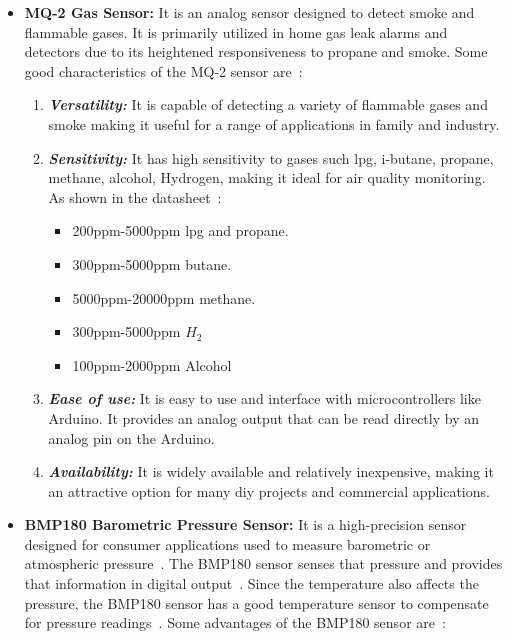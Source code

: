 \begin{itemize}
    \item \textbf{MQ-2 Gas Sensor:} It is an analog sensor designed to detect smoke and flammable gases. It is primarily utilized in home gas leak alarms and detectors due to its heightened responsiveness to propane and smoke. Some good characteristics of the MQ-2 sensor are~\cite{mq2_datasheet, components101_mq2}:

        \begin{enumerate}
            \item \textbf{\textit{Versatility:}} It is capable of detecting a variety of flammable gases and smoke making it useful for a range of applications in family and industry.

            \item \textbf{\textit{Sensitivity:}} It has high sensitivity to gases such \acrfull{lpg}, i-butane, propane, methane, alcohol, Hydrogen, making it ideal for air quality monitoring. As shown in the datasheet~\cite{mq2_datasheet}:

            \begin{itemize}
                \item 200ppm-5000ppm \acrshort{lpg} and propane.

                \item 300ppm-5000ppm butane.

                \item 5000ppm-20000ppm methane.

                \item 300ppm-5000ppm $H_{2}$

                \item 100ppm-2000ppm Alcohol
            \end{itemize}

            \item \textbf{\textit{Ease of use:}} It is easy to use and interface with microcontrollers like Arduino. It provides an analog output that can be read directly by an analog pin on the Arduino.

            \item \textbf{\textit{Availability:}} It is widely available and relatively inexpensive, making it an attractive option for many \acrfull{diy} projects and commercial applications.
        \end{enumerate}

    \item \textbf{BMP180 Barometric Pressure Sensor:} It is a high-precision sensor designed for consumer applications used to measure barometric or atmospheric pressure~\cite{components101_bmp180}. The BMP180 sensor senses that pressure and provides that information in digital output~\cite{bmp180_datasheet}. Since the temperature also affects the pressure, the BMP180 sensor has a good temperature sensor to compensate for pressure readings~\cite{components101_bmp180}. Some advantages of the BMP180 sensor are~\cite{components101_bmp180, bmp180_datasheet}:


\end{itemize}
